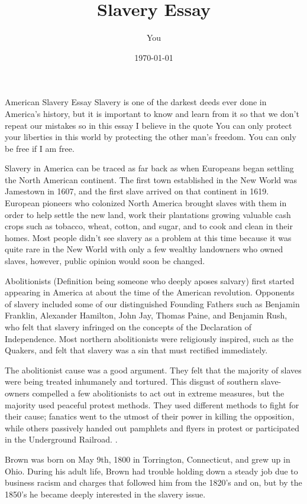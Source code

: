 \documentclass[a4paper]{article}
\title{Slavery Essay}
\author{You}
\date{\today}
\begin{document}
\maketitle
 American Slavery Essay
Slavery is one of the darkest deeds ever done in America's history, but it is important to know and learn from it so that we don't repeat our mistakes so in this essay I believe in the quote You can only protect your liberties in this world by protecting the other man's 
freedom. You can only be free if I am free. 

Slavery in America can be traced as far back as when Europeans began settling the North American continent. The first town established in the New World was Jamestown in 1607, and the first slave arrived on that continent in 1619. European pioneers who colonized North America brought slaves with them in order to help settle the new land, work their plantations growing valuable cash crops such as tobacco, wheat, cotton, and sugar, and to cook and clean in their homes. Most people didn't see slavery as a problem at this time because it was quite rare in the New World with only a few wealthy landowners who owned slaves, however, public opinion would soon be changed.

Abolitionists (Definition being someone who deeply aposes salvary) first started appearing in America at about the time of the American revolution. Opponents of slavery included some of our distinguished Founding Fathers such as Benjamin Franklin, Alexander Hamilton, John Jay, Thomas Paine, and Benjamin Rush, who felt that slavery  infringed on the concepts of the Declaration of Independence. Most northern abolitionists were religiously inspired, such as the Quakers, and felt that slavery was a sin that must rectified immediately.

The abolitionist cause was a good argument. They felt that the majority of slaves were being treated inhumanely and tortured. This disgust of southern slave-owners compelled a few abolitionists to act out in extreme measures, but the majority used peaceful protest methods. They used different methods to fight for their cause; fanatics went to the utmost of their power in killing the opposition, while others passively handed out pamphlets and flyers in protest or participated in the Underground Railroad. .

Brown was born on May 9th, 1800 in Torrington, Connecticut, and grew up in Ohio. During his adult life, Brown had trouble holding down a steady job due to business racism and charges that followed him from the 1820's and on, but by the 1850's he became deeply interested in the slavery issue.
\end{document}
